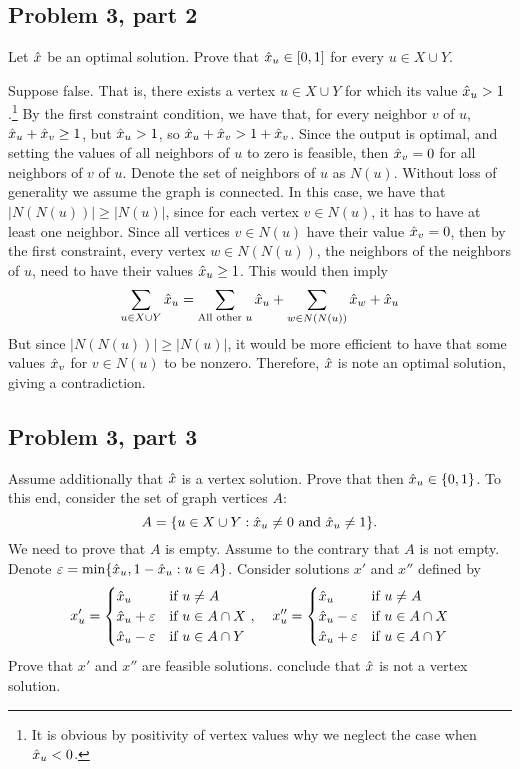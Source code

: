 \subsection{Problem 3, part 2}
Let $\hat{x}$ be an optimal solution. Prove that $\hat{x}_u \in [0, 1]$ for every $u \in X\cup Y$.
\partbreak
\begin{solution}

    Suppose false. That is, there exists a vertex $u \in X \cup Y$ for which its value $\hat{x}_u > 1$.\footnote{It is obvious by positivity of vertex values why we neglect the case when $\hat{x}_u < 0$.} By the first constraint condition, we have that, for every neighbor $v$ of $u$, $\hat{x}_u + \hat{x}_v \geq 1$, but $\hat{x}_u > 1$, so $\hat{x}_u + \hat{x}_v > 1 + \hat{x}_v$. Since the output is optimal, and setting the values of all neighbors of $u$ to zero is feasible, then $\hat{x}_v = 0$ for all neighbors of $v$ of $u$. Denote the set of neighbors of $u$ as $N(u)$. Without loss of generality we assume the graph is connected. In this case, we have that $|N(N(u))| \geq |N(u)|$, since for each vertex $v \in N(u)$, it has to have at least one neighbor. Since all vertices $v \in N(u)$ have their value $\hat{x}_v = 0$, then by the first constraint, every vertex $w \in N(N(u))$, the neighbors of the neighbors of $u$, need to have their values $\hat{x}_u \geq 1$. This would then imply 
    \[\sum_{u \in X \cup Y} \hat{x}_u = \sum_{\text{All other $u$}}\hat{x}_u + \sum_{w \in N(N(u))}\hat{x}_w + \hat{x}_u\]
    But since $|N(N(u))| \geq |N(u)|$, it would be more efficient to have that some values $\hat{x}_v$ for $v \in N(u)$ to be nonzero. Therefore, $\hat{x}$ is note an optimal solution, giving a contradiction. 
\end{solution}
\newpage
\subsection{Problem 3, part 3}
Assume additionally that $\hat{x}$ is a vertex solution. Prove that then $\hat{x}_u \in \{0, 1\}$. To this end, consider the set of graph vertices $A$:
\[A = \{ u \in X \cup Y : \hat{x}_u \neq 0 \text{ and } \hat{x}_u \neq 1\}.\]
We need to prove that $A$ is empty. Assume to the contrary that $A$ is not empty. Denote $\varepsilon = \min \{ \hat{x}_u , 1 - \hat{x}_u : u \in A\}$. Consider solutions $x'$ and $x''$ defined by
\begin{equation*}
    x'_u = \begin{cases}
        \hat{x}_u &\text{if } u \neq A\\
        \hat{x}_u + \varepsilon &\text{if } u \in A\cap X \ ,\\
        \hat{x}_u - \varepsilon &\text{if } u \in A\cap Y\\
    \end{cases}\quad
    x''_u = \begin{cases}
        \hat{x}_u &\text{if } u \neq A\\
        \hat{x}_u - \varepsilon &\text{if } u \in A\cap X\\
        \hat{x}_u + \varepsilon &\text{if } u \in A\cap Y\\
    \end{cases}
\end{equation*}
Prove that $x'$ and $x''$ are feasible solutions. conclude that $\hat{x}$ is not a vertex solution. 

